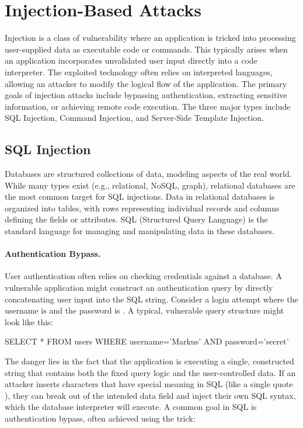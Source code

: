 \section{Injection-Based Attacks}
Injection is a class of vulnerability where an application is tricked into processing user-supplied data as executable code or commands. This typically arises when an application incorporates unvalidated user input directly into a code interpreter. The exploited technology often relies on interpreted languages, allowing an attacker to modify the logical flow of the application. The primary goals of injection attacks include bypassing authentication, extracting sensitive information, or achieving remote code execution. The three major types include SQL Injection, Command Injection, and Server-Side Template Injection.

\subsection{SQL Injection}
Databases are structured collections of data, modeling aspects of the real world. While many types exist (e.g., relational, NoSQL, graph), relational databases are the most common target for SQL injections. Data in relational databases is organized into tables, with rows representing individual records and columns defining the fields or attributes. SQL (Structured Query Language) is the standard language for managing and manipulating data in these databases.

\paragraph{Authentication Bypass.} User authentication often relies on checking credentials against a database. A vulnerable application might construct an authentication query by directly concatenating user input into the SQL string. Consider a login attempt where the username is  and the password is . A typical, vulnerable query structure might look like this:

\begin{sqlcode}
    SELECT * FROM users WHERE username='Markus' AND password='secret'
\end{sqlcode}

The danger lies in the fact that the application is executing a single, constructed string that contains both the fixed query logic and the user-controlled data. If an attacker inserts characters that have special meaning in SQL (like a single quote ), they can break out of the intended data field and inject their own SQL syntax, which the database interpreter will execute. A common goal in SQL is authentication bypass, often achieved using the  trick:

